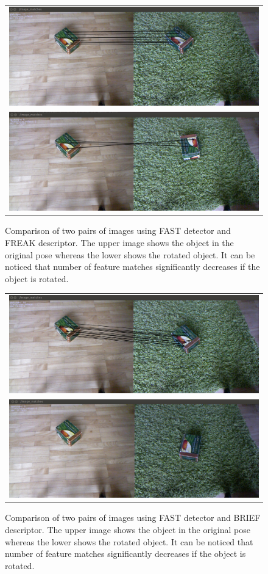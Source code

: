 \begin{figure}
    \begin{tabular}{c}
 

\includegraphics[width=0.7\columnwidth]{figures/freak-no-rotation.png}\\
\includegraphics[width=0.7\columnwidth]{figures/freak-rotation.png}\\
    \end{tabular}


\caption{Comparison of two pairs of images using FAST detector and FREAK descriptor. The upper image shows the object in the original pose whereas the lower shows the rotated object. It can be noticed that number of feature matches significantly decreases if the object is rotated. }
\label{fig:freak-features}
\end{figure}

\begin{figure}
    \begin{tabular}{c}
 

\includegraphics[width=0.7\columnwidth]{figures/brief-no-rotation.png}\\
\includegraphics[width=0.7\columnwidth]{figures/brief-rotation.png}\\
    \end{tabular}


\caption{Comparison of two pairs of images using FAST detector and BRIEF descriptor. The upper image shows the object in the original pose whereas the lower shows the rotated object. It can be noticed that number of feature matches significantly decreases if the object is rotated. }
\label{fig:brief-features}
\end{figure}

